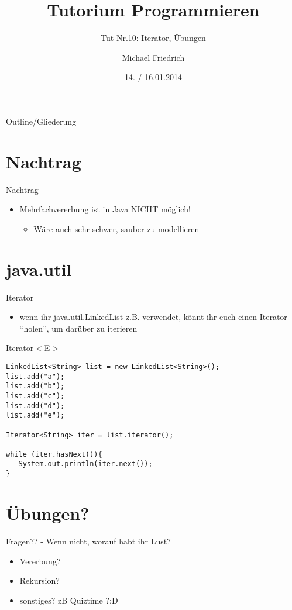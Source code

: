 \documentclass[18pt]{beamer}
\title[Prog Tut Nr. 10]{Tutorium Programmieren}
\subtitle{Tut Nr.10: Iterator, Übungen}
\author{Michael Friedrich}
\date{14. / 16.01.2014}
\institute{Institut f\"ur theoretische Informatik}
\begin{document}

\begin{frame}
	\titlepage
\end{frame}

\begin{frame}{Outline/Gliederung}

	\tableofcontents
\end{frame}

\section{Nachtrag}
\begin{frame}{Nachtrag}
\begin{itemize}
	\item Mehrfachvererbung ist in Java NICHT möglich!
	\begin{itemize}
	\item Wäre auch sehr schwer, sauber zu modellieren
	\end{itemize}
\end{itemize}
\end{frame}

\section{java.util}
\begin{frame}[fragile]{Iterator}
\begin{itemize}
	\item wenn ihr java.util.LinkedList z.B. verwendet, könnt ihr euch einen Iterator "`holen"', um darüber zu iterieren \pause
\end{itemize}
\begin{exampleblock}{Iterator$<$E$>$}
\begin{lstlisting}
LinkedList<String> list = new LinkedList<String>();
list.add("a");
list.add("b");
list.add("c");
list.add("d");
list.add("e");

Iterator<String> iter = list.iterator();

while (iter.hasNext()){
   System.out.println(iter.next());
}
\end{lstlisting}
\end{exampleblock}
\end{frame}

\section{Übungen?}
\begin{frame}
Fragen?? - Wenn nicht, worauf habt ihr Lust?
\begin{itemize}
	\item Vererbung?
	\item Rekursion?
	\item sonstiges? zB Quiztime ?:D
\end{itemize}
\end{frame}


\appendix
\beginbackup


\backupend
\end{document}

